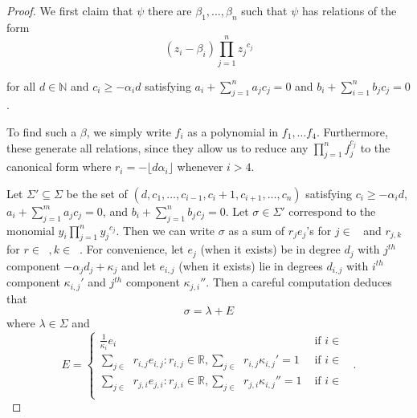 \documentclass{amsart}
\theoremstyle{plain}
\theoremstyle{definition}
\theoremstyle{remark}
\numberwithin{equation}{section}
\newcommand\br{{\mathbb R}}
\newcommand\bida{a}
\newcommand\bidb{b}
\DeclareMathOperator{\Te}{T_=}
\DeclareMathOperator{\Tp}{T_+}
\DeclareMathOperator{\Tm}{T_-}
\begin{document}
\begin{proof}
We first claim that $\psi$ there are $\beta_1, \ldots, \beta_n$ such that $\psi$ has relations of the form
\begin{equation}
\label{eqn:hirz-relations-psi}
	(z_i - \beta_i)\prod_{j=1}^n {z_j}^{c_{j}}
\end{equation}

\noindent
for all $d \in \mathbb{N}$ and $c_i \ge -\alpha_i d$ satisfying $\bida_i + \sum_{j = 1}
^n \bida_j c_j = 0$ and $\bidb_i + \sum_{i=1}^n \bidb_j c_j = 0$.

To find such a $\beta$, we simply write $f_i$ as a 
polynomial in $f_1, \ldots f_4$. Furthermore, these
generate all relations, since they allow us to reduce any $\prod_{j =
1}^n f_j^{c_j}$ to the canonical form where $r_i = - \lfloor d \alpha_i \rfloor$ whenever $i > 4$. 

Let $\Sigma'\subseteq \Sigma$ be the 
set of $(d, c_1, \ldots, c_{i-1}, c_i + 1, c_{i+1}, \ldots , c_n)$ satisfying $c_i \ge -\alpha_i d$,
$\bida_i + \sum_{j = 1}^m \bida_j c_j = 0$, and $\bidb_i + \sum_{j=1}^n \bidb_j c_j
= 0$.  
Let $\sigma\in \Sigma'$ correspond to the monomial $y_i \prod_{j=1}^n {y_j}^{c_j}$.  Then we can write $\sigma$ as a sum of $r_j e_j$'s for $j\in \Te$ and $r_{j,k}$ for $r\in \Tp, k\in \Tm$.  
For convenience, let $e_j$ (when it exists) be in degree $d_j$ with $j^{th}$ component $-\alpha_j d_j + \kappa_j$ and let $e_{i,j}$ (when it exists) lie in degrees $d_{i,j}$ with $i^{th}$ component $\kappa_{i,j}'$ and $j^{th}$ component $\kappa_{j,i}''$.
Then a careful computation deduces that 
\[
	\sigma = \lambda + E
\]
where $\lambda \in \Sigma$ and
\begin{equation}\label{eqn:hirz-E-translation}
	E = \begin{cases}
	\frac{1}{\kappa_i} e_i  	&  \mbox{ if }i\in \Te\\
	\sum_{j\in \Tm} r_{i,j} e_{i,j}: r_{i,j}\in \br, \sum_{j\in \Tm} r_{i,j}\kappa_{i,j}' = 1 & \mbox{ if } i\in \Tp\\
	\sum_{j\in \Tp} r_{j,i} e_{j,i}: r_{j,i} \in \br, \sum_{j\in \Tm} r_{j,i} \kappa_{i,j}'' = 1 	& \mbox{ if } i\in \Tm\\
	\end{cases}.
\end{equation}


\end{proof}
\end{document}
